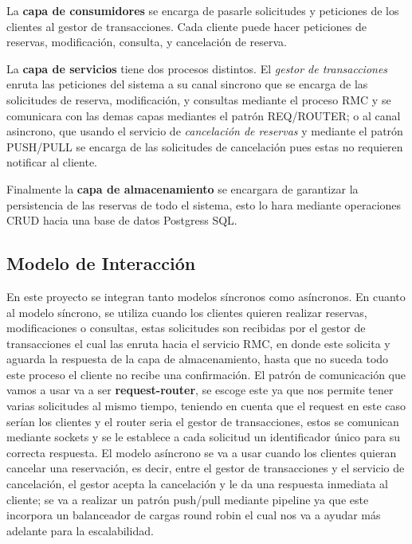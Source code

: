 \documentclass[10pt, a4paper]{article}
\begin{document}
	La \textbf{capa de consumidores} se encarga de pasarle solicitudes y peticiones de los clientes al gestor de transacciones. Cada cliente puede hacer peticiones de reservas, modificación, consulta, y cancelación de reserva.
	
	La \textbf{capa de servicios} tiene dos procesos distintos. El \textit{gestor de transacciones} enruta las peticiones del sistema a su canal sincrono que se encarga de las solicitudes de reserva, modificación, y consultas mediante el proceso RMC y se comunicara con las demas capas mediantes el patrón REQ/ROUTER; o al canal asincrono, que usando el servicio de \textit{cancelación de reservas} y mediante el patrón PUSH/PULL se encarga de las solicitudes de cancelación pues estas no requieren notificar al cliente.
	
	Finalmente la \textbf{capa de almacenamiento} se encargara de garantizar la persistencia de las reservas de todo el sistema, esto lo hara mediante operaciones CRUD hacia una base de datos Postgress SQL.
	
	
	\subsection{Modelo de Interacción}
	\label{sec:models_exch}
	
	En este proyecto se integran tanto modelos síncronos como asíncronos. 
	En cuanto al modelo síncrono, se utiliza cuando los clientes quieren realizar reservas, modificaciones o consultas, estas solicitudes son recibidas por el gestor de transacciones el cual las enruta hacia el servicio RMC, en donde este solicita y aguarda la respuesta de la capa de almacenamiento, hasta que no suceda todo este proceso el cliente no recibe una confirmación. El patrón de comunicación que vamos a usar va a ser \textbf{request-router}, se escoge este ya que nos permite tener varias solicitudes al mismo tiempo, teniendo en cuenta que el request en este caso serían los clientes y el router seria el gestor de transacciones, estos se comunican mediante sockets y se le establece a cada solicitud un identificador único para su correcta respuesta.
	El modelo asíncrono se va a usar cuando los clientes quieran cancelar una reservación, es decir, entre el gestor de transacciones y el servicio de cancelación, el gestor acepta la cancelación y le da una respuesta inmediata al cliente; se va a realizar un patrón push/pull mediante pipeline ya que este incorpora un balanceador de cargas round robin el cual nos va a ayudar más adelante para la escalabilidad.
	
\end{document}
